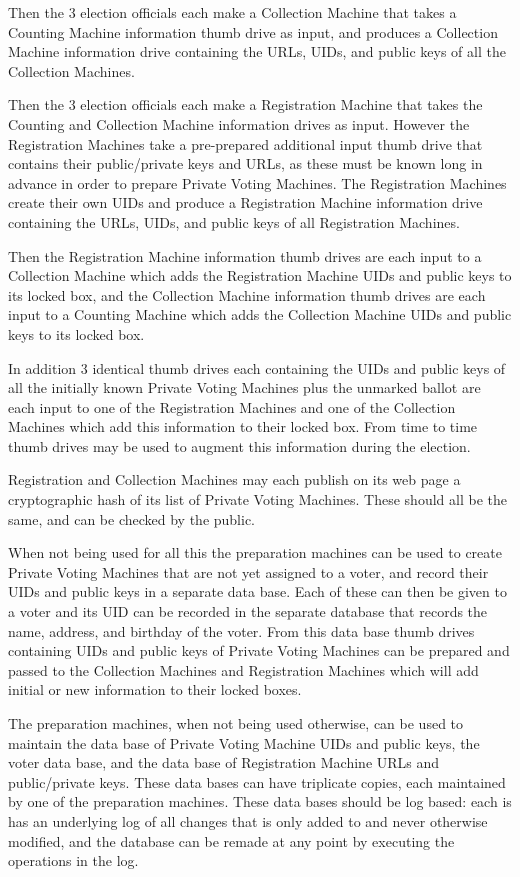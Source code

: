 \documentclass[12pt]{article}
\begin{document}
Then the 3 election officials each make a Collection Machine
that takes a Counting Machine information thumb drive as input,
and produces a Collection Machine information drive containing
the URLs, UIDs, and public keys of all the Collection Machines.

Then the 3 election officials each make a Registration Machine
that takes the Counting and Collection Machine information
drives as input.  However the Registration Machines take
a pre-prepared additional input thumb drive that contains
their public/private keys and URLs, as these must be known
long in advance in order to prepare Private Voting Machines.
The Registration Machines create their own UIDs
and produce a Registration Machine information
drive containing the URLs, UIDs, and public keys of all Registration
Machines.

Then the Registration Machine information thumb drives are each input
to a Collection Machine which adds the Registration Machine
UIDs and public keys to its locked
box, and the Collection Machine information thumb drives are each
input to a Counting Machine which adds the Collection Machine
UIDs and public keys to its locked box.

In addition 3 identical thumb drives each containing the UIDs and public
keys of all the initially known Private Voting Machines plus
the unmarked ballot are
each input to one of the Registration Machines and one of the
Collection Machines which add this information to their locked
box.  From time to time thumb drives may be used to augment
this information during the election.

Registration and Collection Machines may each publish on its web page
a cryptographic hash of its list of Private Voting Machines.
These should all be the same, and can be checked by the public.

When not being used for all this the preparation machines can
be used to create Private Voting Machines that are not yet
assigned to a voter, and record their UIDs and public keys
in a separate data base.  Each of these can then be given to a voter
and its UID can be recorded in the separate database that records
the name, address, and birthday of the voter.  From this
data base thumb drives containing UIDs and public keys of
Private Voting Machines can be prepared and passed to the
Collection Machines and Registration Machines which will add
initial or new information to their locked boxes.

The preparation machines, when not being used otherwise, can
be used to maintain the data base of Private Voting Machine
UIDs and public keys,
the voter data base, and the data base of
Registration Machine URLs and public/private keys.
These data bases can have triplicate copies, each maintained
by one of the preparation machines.  These data bases should
be log based: each is has an underlying log of all changes
that is only added to and never otherwise modified,
and the database can be remade at any point by executing the
operations in the log.
\end{document}
